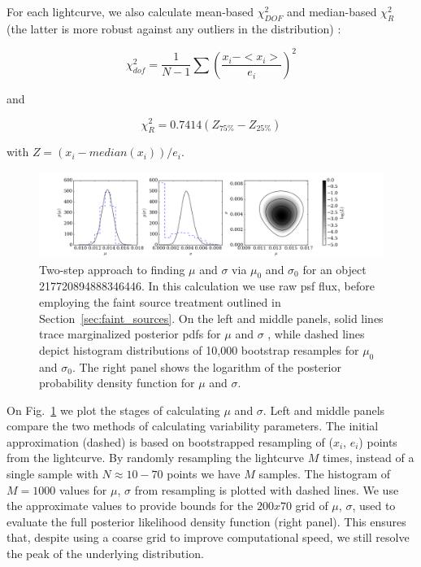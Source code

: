 \documentclass[fleqn,usenatbib]{mnras}  %
\begin{document}
For each lightcurve, we also calculate mean-based $\chi^{2}_{DOF}$ and median-based $\chi^{2}_{R}$ (the latter is more robust against any outliers in the distribution) : 

\begin{equation}
\label{eqn:chi2DOF}
\chi^{2}_{dof} = \frac{1}{N-1}\sum{\left( \frac{x_{i} - <x_{i}>} {e_{i}} \right) ^{2}}
\end{equation}

\noindent and
 
\begin{equation}
\label{eqn:chi2R}
\chi^{2}_{R} = 0.7414 (Z_{75\%} - Z_{25\%} ) 
\end{equation}

\noindent with $Z=(x_{i} - median(x_{i})) / e_{i} $. 
\bigskip

\begin{figure}
\label{fig:sigma_example}
\includegraphics[width=\textwidth]{Fig_5-8_AstroML_obj_217720894888346446_.png}
\cprotect\caption{Two-step approach to finding $\mu$ and $\sigma$ via $\mu_{0}$ and $\sigma_{0}$ for an object 217720894888346446. In this calculation we use raw psf flux, before employing the faint source treatment outlined in Section~\ref{sec:faint_sources}. On the left and middle panels,  solid lines trace marginalized posterior pdfs for $\mu$ and $\sigma$ , while dashed lines depict histogram distributions of 10,000 bootstrap resamples for $\mu_{0}$ and $\sigma_{0}$. The right panel shows the logarithm of the posterior probability density function for $\mu$ and $\sigma$.}
\end{figure}

On Fig.~\ref{fig:sigma_example} we plot the stages of calculating $\mu$ and $\sigma$. Left and middle panels compare the two methods of calculating variability parameters. The initial approximation (dashed) is based on bootstrapped resampling of ($x_i$, $e_i$) points from  the lightcurve. By randomly resampling the lightcurve $M$ times, instead of a single sample with $N \approx 10-70 $ points  we have $M$ samples. The histogram of  $M=1000$ values for $\mu$, $\sigma$ from resampling is plotted with dashed lines. 
We use the approximate values to provide bounds for the $200 x 70$ grid of $\mu$, $\sigma$, used to evaluate the full posterior likelihood density function (right panel). This ensures that, despite using a coarse grid to improve computational speed,  we still resolve the peak of the underlying distribution. 
\end{document}
